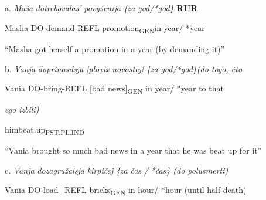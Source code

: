 \documentclass[output=paper,modfonts, nonflat]{langsci/langscibook}
\begin{document}
\begin{styleinnerExample}
\begin{styleinnerExample}
\ea%
    \label{ex:key:38}
    \gll\\
        \\
    \glt
    \z

           a.  \textit{Maša}   \textit{dotrebovalas’}          \textit{povyšenija}        \textit{\{za} \textit{god/*god\}} \textbf{RUR}
\end{styleinnerExample}

\begin{styleinnerExample}
    Masha DO-demand-REFL promotion\textsubscript{GEN}in year/     *year
\end{styleinnerExample}

\begin{styleinnerExample}
    “Masha got herself  a promotion in a year (by demanding it)”
\end{styleinnerExample}

\begin{styleinnerExample}
  b.  \textit{Vanja} \textit{doprinosilsja}      \textit{[ploxix} \textit{novostej]} \textit{\{za} \textit{god/*god\}(do togo, čto} 
\end{styleinnerExample}

\begin{styleinnerExample}
    Vania DO-bring-REFL [bad    news]\textsubscript{GEN}  in year/ *year to that 
\end{styleinnerExample}

\begin{styleinnerExample}
    \textit{ego} \textit{izbili)}
\end{styleinnerExample}

\begin{styleinnerExample}
    himbeat.up\textsubscript{PST.PL.IND}
\end{styleinnerExample}

\begin{styleinnerExample}
    “Vania brought so much bad news in a year that he was beat up for it”
\end{styleinnerExample}

\begin{styleinnerExample}
  c.  \textit{Vanja} \textit{dozagružalsja}     \textit{kirpičej}  \textit{\{za} \textit{čas} \textit{/} \textit{*čas\} (do     polusmerti)}
\end{styleinnerExample}

\begin{styleinnerExample}
    Vania DO-load\_REFL bricks\textsubscript{GEN} in hour/ *hour (until half-death)
\end{styleinnerExample}


\end{styleinnerExample}
\end{document}

